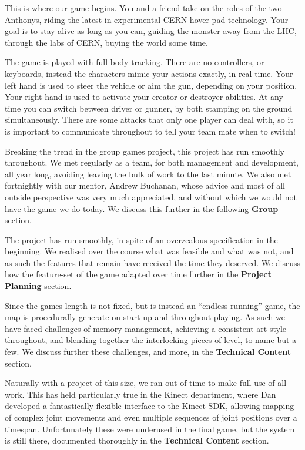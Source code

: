\documentclass[a4paper,oneside]{memoir}
\begin{document}
		This is where our game begins. 
		You and a friend take on the roles of the two Anthonys, riding the latest in experimental CERN hover pad technology.
		Your goal is to stay alive as long as you can, guiding the monster away from the LHC, through the labs of CERN, buying the world some time.

		The game is played with full body tracking. 
		There are no controllers, or keyboards, instead the characters mimic your actions exactly, in real-time.
		Your left hand is used to steer the vehicle or aim the gun, depending on your position.
		Your right hand is used to activate your creator or destroyer abilities.
		At any time you can switch between driver or gunner, by both stamping on the ground simultaneously.
		There are some attacks that only one player can deal with, so it is important to communicate throughout to tell your team mate when to switch!

		Breaking the trend in the group games project, this project has run smoothly throughout. 
		We met regularly as a team, for both management and development, all year long, avoiding leaving the bulk of work to the last minute.
		We also met fortnightly with our mentor, Andrew Buchanan, whose advice and most of all outside perspective was very much appreciated, and without which we would not have the game we do today.
		We discuss this further in the following \textbf{Group} section.

		The project has run smoothly, in spite of an overzealous specification in the beginning. 
		We realised over the course what was feasible and what was not, and as such the features that remain have received the time they deserved.
		We discuss how the feature-set of the game adapted over time further in the \textbf{Project Planning} section.

		Since the games length is not fixed, but is instead an ``endless running'' game, the map is procedurally generate on start up and throughout playing.
		As such we have faced challenges of memory management, achieving a consistent art style throughout, and blending together the interlocking pieces of level, to name but a few. We discuss further these challenges, and more, in the \textbf{Technical Content} section.

		Naturally with a project of this size, we ran out of time to make full use of all work.
		This has held particularly true in the Kinect department, where Dan developed a fantastically flexible interface to the Kinect SDK, allowing mapping of complex joint movements and even multiple sequences of joint positions over a timespan.
		Unfortunately these were underused in the final game, but the system is still there, documented thoroughly in the \textbf{Technical Content} section.
\end{document}
